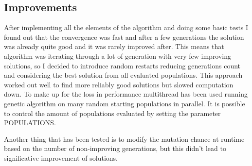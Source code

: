 	\subsection{Improvements}
		After implementing all the elements of the algorithm and doing some basic tests I found out that the convergence was fast and after a few generations the solution was already quite good and it was rarely improved after. This means that algorithm was iterating through a lot of generation with very few improving solutions, so I decided to introduce random restarts reducing generations count and considering the best solution from all evaluated populations. This approach worked out well to find more reliably good solutions but slowed computation down. To make up for the loss in performance multithread has been used running genetic algorithm on many random starting populations in parallel. It is possible to control the amount of populations evaluated by setting the parameter POPULATIONS.
		
		Another thing that has been tested is to modify the mutation chance at runtime based on the number of non-improving generations, but this didn't lead to significative improvement of solutions.
		
		